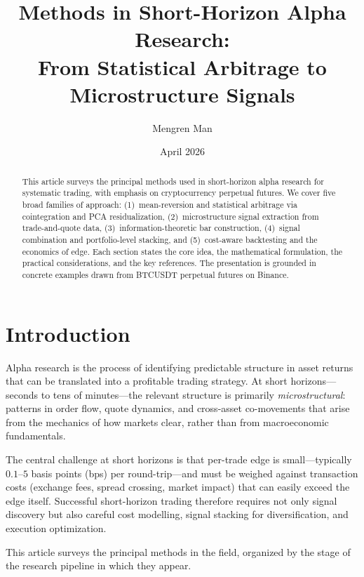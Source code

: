 \documentclass[11pt,a4paper]{article}
\title{Methods in Short-Horizon Alpha Research:\\
From Statistical Arbitrage to Microstructure Signals}
\author{Mengren Man}
\date{April 2026}
\begin{document}
\maketitle

\begin{abstract}
This article surveys the principal methods used in short-horizon alpha
research for systematic trading, with emphasis on cryptocurrency
perpetual futures. We cover five broad families of approach:
(1)~mean-reversion and statistical arbitrage via cointegration and
PCA residualization, (2)~microstructure signal extraction from
trade-and-quote data, (3)~information-theoretic bar construction,
(4)~signal combination and portfolio-level stacking, and
(5)~cost-aware backtesting and the economics of edge.
Each section states the core idea, the mathematical formulation,
the practical considerations, and the key references.
The presentation is grounded in concrete examples drawn from
BTCUSDT perpetual futures on Binance.
\end{abstract}

\tableofcontents
\newpage

\section{Introduction}

Alpha research is the process of identifying predictable structure in
asset returns that can be translated into a profitable trading strategy.
At short horizons---seconds to tens of minutes---the relevant structure
is primarily \emph{microstructural}: patterns in order flow, quote
dynamics, and cross-asset co-movements that arise from the mechanics of
how markets clear, rather than from macroeconomic fundamentals.

The central challenge at short horizons is that per-trade edge is
small---typically $0.1$--$5$ basis points (bps) per round-trip---and
must be weighed against transaction costs (exchange fees, spread
crossing, market impact) that can easily exceed the edge itself.
Successful short-horizon trading therefore requires not only signal
discovery but also careful cost modelling, signal stacking for
diversification, and execution optimization.

This article surveys the principal methods in the field, organized by
the stage of the research pipeline in which they appear.

\end{document}
